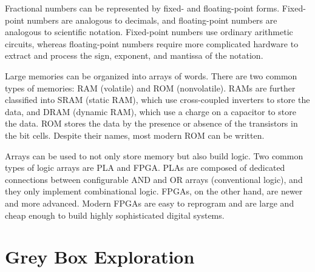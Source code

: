 \documentclass[12pt]{article}
\numberwithin{figure}{subsection}
\numberwithin{table}{subsection}
\numberwithin{equation}{subsection}
\begin{document}
Fractional numbers can be represented by fixed- and floating-point forms. Fixed-point numbers are analogous to decimals, and floating-point numbers are analogous to scientific notation. Fixed-point numbers use ordinary arithmetic circuits, whereas floating-point numbers require more complicated hardware to extract and process the sign, exponent, and mantissa of the notation.

Large memories can be organized into arrays of words. There are two common types of memories: RAM (volatile) and ROM (nonvolatile). RAMs are further classified into SRAM (static RAM), which use cross-coupled inverters to store the data, and DRAM (dynamic RAM), which use a charge on a capacitor to store the data. ROM stores the data by the presence or absence of the transistors in the bit cells. Despite their names, most modern ROM can be written.

Arrays can be used to not only store memory but also build logic. Two common types of logic arrays are PLA and FPGA. PLAs are composed of dedicated connections between configurable AND and OR arrays (conventional logic), and they only implement combinational logic. FPGAs, on the other hand, are newer and more advanced. Modern FPGAs are easy to reprogram and are large and cheap enough to build highly sophisticated digital systems.

\section{Grey Box Exploration}
\end{document}
